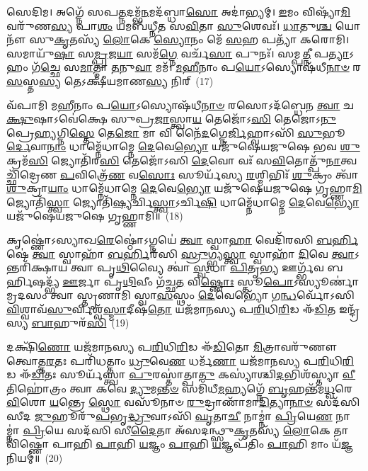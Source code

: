𑌸𑍇𑌦𑌿𑌮। 𑌅𑌗𑍍𑌨𑍇᳴ 𑌸𑌪\-\ul{𑌤𑍍𑌨}\-𑌦𑌮𑍍𑌭᳴\-\ul{𑌨}\-𑌮𑌦᳴𑌬𑍍𑌧𑌾\-\ul{𑌸𑍋} 𑌅𑌦𑌾॑𑌭𑍍𑌯𑌮𑍍। \ul{𑌇}\-𑌮𑌂 𑌵𑌿𑌷𑍍𑌯𑌾᳴\-\ul{𑌮𑌿} 𑌵𑌰𑍁᳴𑌣\-\ul{𑌸𑍍𑌯} 𑌪𑌾\-\ul{𑌶𑌂} 𑌯𑌮𑌬᳴𑌧𑍍𑌨𑍀𑌤 𑌸\-\ul{𑌵𑌿}\-𑌤𑌾 \ul{𑌸𑍁}\-𑌶𑍇𑌵𑌃᳴। \ul{𑌧𑌾}\-𑌤𑍁\-\ul{𑌶𑍍𑌚} 𑌯𑍋𑌨𑍗᳴ 𑌸𑍁\-\ul{𑌕𑍃}\-𑌤𑌸𑍍𑌯᳴ \ul{𑌲𑍋}\-𑌕𑍇 \ul{𑌸𑍍𑌯𑍋}\-𑌨𑌂 𑌮𑍇᳴ \ul{𑌸}\-𑌹 𑌪𑌤𑍍𑌯𑌾᳴ 𑌕𑌰𑍋𑌮𑌿। 𑌸𑌮𑌾𑌯𑍁᳴\-\ul{𑌷𑌾} 𑌸\-\ul{𑌮𑍍𑌪𑍍𑌰}\-𑌜\-\ul{𑌯𑌾} 𑌸𑌮᳴\-\ul{𑌗𑍍𑌨𑍇} 𑌵𑌰𑍍𑌚᳴\-\ul{𑌸𑌾} 𑌪𑍁𑌨𑌃᳴। 𑌸𑌮𑍍𑌪\-\ul{𑌤𑍍𑌨𑍀} 𑌪\-\ul{𑌤𑍍𑌯𑌾}\-\-𑌽𑌹𑌂 𑌗᳴\-\ul{𑌚𑍍𑌛𑍇} 𑌸\-\ul{𑌮𑌾}\-𑌤𑍍𑌮𑌾 \ul{𑌤}\-𑌨𑍁\-\ul{𑌵𑌾} 𑌮𑌮᳴। \ul{𑌮}\-\-\ul{𑌹𑍀}\-𑌨𑌾𑌂 𑌪\-\ul{𑌯𑍋}\-\-𑌽𑌸𑍍𑌯𑍋𑌷᳴𑌧𑍀\-\ul{𑌨𑌾}\-\-\ul{𑍞} 𑌰\-\ul{𑌸}\-𑌸𑍍𑌤\-\ul{𑌸𑍍𑌯} 𑌤𑍇\-𑌽𑌕𑍍𑌷𑍀᳴𑌯𑌮𑌾𑌣\-\ul{𑌸𑍍𑌯} 𑌨𑌿𑌰𑍍~(17)

𑌵᳴𑌪𑌾𑌮𑌿 𑌮\-\ul{𑌹𑍀}\-𑌨𑌾𑌂 𑌪\-\ul{𑌯𑍋}\-\-𑌽𑌸𑍍𑌯𑍋𑌷᳴𑌧𑍀\-\ul{𑌨𑌾}\-\-\ul{𑍞} 𑌰𑌸𑍋\-𑌽𑌦᳴𑌬𑍍𑌧𑍇𑌨 \ul{𑌤𑍍𑌵𑌾} 𑌚\-\ul{𑌕𑍍𑌷𑍁}\-𑌷𑌾\-𑌽𑌵𑍇॑𑌕𑍍𑌷𑍇 𑌸𑍁𑌪𑍍𑌰\-\ul{𑌜𑌾}\-𑌸𑍍𑌤𑍍𑌵𑌾\-\ul{𑌯} 𑌤𑍇𑌜𑍋᳴\-𑌽\-\ul{𑌸𑌿} 𑌤𑍇𑌜𑍋\-𑌽\-\ul{𑌨𑍁} 𑌪𑍍𑌰𑍇\-\ul{𑌹𑍍𑌯}\-𑌗𑍍𑌨𑌿\-\ul{𑌸𑍍𑌤𑍇} 𑌤𑍇\-\ul{𑌜𑍋} 𑌮𑌾 𑌵𑌿 𑌨𑍈᳴\-\ul{𑌦}\-𑌗𑍍𑌨𑍇\-\ul{𑌰𑍍𑌜𑌿}\-𑌹𑍍𑌵𑌾\-𑌽𑌸𑌿᳴ \ul{𑌸𑍁}\-𑌭𑍂\-\ul{𑌰𑍍𑌦𑍇}\-𑌵𑌾\-\ul{𑌨𑌾𑌂} 𑌧𑌾𑌮𑍍𑌨𑍇᳴𑌧𑌾𑌮𑍍𑌨𑍇 \ul{𑌦𑍇}\-𑌵𑍇\-\ul{𑌭𑍍𑌯𑍋} 𑌯𑌜𑍁᳴𑌷𑍇𑌯𑌜𑍁𑌷𑍇 𑌭𑌵 \ul{𑌶𑍁}\-𑌕𑍍𑌰𑌮᳴\-\ul{𑌸𑌿} 𑌜𑍍𑌯𑍋𑌤𑌿᳴𑌰\-\ul{𑌸𑌿} 𑌤𑍇𑌜𑍋᳴\-𑌽𑌸𑌿 \ul{𑌦𑍇}\-𑌵𑍋 𑌵𑌃᳴ 𑌸\-\ul{𑌵𑌿}\-𑌤𑍋𑌤𑍍𑌪𑍁᳴\-\ul{𑌨𑌾}\-𑌤𑍍𑌵𑌚𑍍𑌛𑌿᳴𑌦𑍍𑌰𑍇𑌣 \ul{𑌪}\-𑌵𑌿𑌤𑍍𑌰𑍇᳴\-\ul{𑌣} 𑌵\-\ul{𑌸𑍋𑌃} 𑌸𑍂𑌰𑍍𑌯᳴𑌸𑍍𑌯 \ul{𑌰}\-𑌶𑍍𑌮𑌿𑌭𑌿𑌃᳴ \ul{𑌶𑍁}\-𑌕𑍍𑌰𑌂 𑌤𑍍𑌵𑌾᳴ \ul{𑌶𑍁}\-𑌕𑍍𑌰𑌾\-\ul{𑌯𑌾𑌂} 𑌧𑌾𑌮𑍍𑌨𑍇᳴𑌧𑌾𑌮𑍍𑌨𑍇 \ul{𑌦𑍇}\-𑌵𑍇\-\ul{𑌭𑍍𑌯𑍋} 𑌯𑌜𑍁᳴𑌷𑍇𑌯𑌜𑍁𑌷𑍇 𑌗𑍃𑌹𑍍𑌣𑌾\-\ul{𑌮𑌿} 𑌜𑍍𑌯𑍋𑌤𑌿᳴\-\ul{𑌸𑍍𑌤𑍍𑌵𑌾} 𑌜𑍍𑌯𑍋𑌤𑌿᳴\-\ul{𑌷𑍍𑌯}\-𑌰𑍍𑌚𑌿\-\ul{𑌸𑍍𑌤𑍍𑌵𑌾}\-\-𑌽𑌰𑍍𑌚𑌿\-\ul{𑌷𑌿} 𑌧𑌾𑌮𑍍𑌨𑍇᳴𑌧𑌾𑌮𑍍𑌨𑍇 \ul{𑌦𑍇}\-𑌵𑍇\-\ul{𑌭𑍍𑌯𑍋} 𑌯𑌜𑍁᳴𑌷𑍇𑌯𑌜𑍁𑌷𑍇 𑌗𑍃𑌹𑍍𑌣𑌾𑌮𑌿॥~(18)

{\anuvakamend[{𑌉\-\ul{𑌪} 𑌨𑍀 \ul{𑌰}\-𑌶𑍍𑌮𑌿𑌭𑌿𑌃᳴ \ul{𑌶𑍁}\-𑌕𑍍𑌰𑍞 𑌷𑍋𑌡᳴𑌶 𑌚}]}

𑌕𑍃𑌷𑍍𑌣𑍋॑\-𑌽𑌸𑍍𑌯𑌾𑌖\-\ul{𑌰𑍇}\-𑌷𑍍𑌠𑍋॑\-𑌽𑌗𑍍𑌨𑌯𑍇॑ \ul{𑌤𑍍𑌵𑌾} 𑌸𑍍𑌵𑌾\-\ul{𑌹𑌾} 𑌵𑍇𑌦𑌿᳴𑌰𑌸𑌿 \ul{𑌬}\-\-\ul{𑌰𑍍}\-𑌹𑌿𑌷𑍇॑ \ul{𑌤𑍍𑌵𑌾} 𑌸𑍍𑌵𑌾𑌹𑌾᳴ \ul{𑌬}\-\-\ul{𑌰𑍍}\-𑌹𑌿𑌰᳴𑌸𑌿 \ul{𑌸𑍍𑌰𑍁}\-𑌗𑍍𑌭𑍍𑌯\-\ul{𑌸𑍍𑌤𑍍𑌵𑌾} 𑌸𑍍𑌵𑌾𑌹𑌾᳴ \ul{𑌦𑌿}\-𑌵𑍇 \ul{𑌤𑍍𑌵𑌾}\-\-𑌽𑌨𑍍𑌤𑌰𑌿᳴𑌕𑍍𑌷𑌾𑌯 𑌤𑍍𑌵𑌾 𑌪𑍃\-\ul{𑌥𑌿}\-𑌵𑍍𑌯𑍈 𑌤𑍍𑌵𑌾॑ \ul{𑌸𑍍𑌵}\-𑌧𑌾 \ul{𑌪𑌿}\-𑌤𑍃\-\ul{𑌭𑍍𑌯} 𑌊𑌰𑍍𑌗𑍍𑌭᳴𑌵 𑌬𑌰𑍍\mbox{}\-\ul{𑌹𑌿}\-𑌷𑌦𑍍𑌭𑍍𑌯᳴ \ul{𑌊}\-𑌰𑍍𑌜𑌾 𑌪𑍃᳴\-\ul{𑌥𑌿}\-𑌵𑍀𑌂 𑌗᳴𑌚𑍍𑌛\-\ul{𑌤} 𑌵𑌿\-\ul{𑌷𑍍𑌣𑍋𑌃} 𑌸𑍍𑌤𑍂\-\ul{𑌪𑍋}\-\-𑌽𑌸𑍍𑌯𑍂𑌰𑍍𑌣𑌾॑𑌮𑍍𑌰𑌦𑌸𑌂 𑌤𑍍𑌵𑌾 𑌸𑍍𑌤𑍃𑌣𑌾𑌮𑌿 𑌸𑍍𑌵𑌾\-\ul{𑌸}\-𑌸𑍍𑌥𑌂 \ul{𑌦𑍇}\-𑌵𑍇𑌭𑍍𑌯𑍋᳴ 𑌗\-\ul{𑌨𑍍𑌧}\-𑌰𑍍𑌵𑍋᳴\-𑌽𑌸𑌿 \ul{𑌵𑌿}\-𑌶𑍍𑌵𑌾𑌵᳴\-\ul{𑌸𑍁}\-𑌰𑍍𑌵𑌿𑌶𑍍𑌵᳴\-\ul{𑌸𑍍𑌮𑌾}\-𑌦𑍀𑌷᳴\-\ul{𑌤𑍋} 𑌯𑌜᳴𑌮𑌾𑌨𑌸𑍍𑌯 𑌪\-\ul{𑌰𑌿}\-𑌧𑌿\-\ul{𑌰𑌿}\-𑌡 𑌈᳴\-\ul{𑌡𑌿}\-𑌤 𑌇𑌨𑍍𑌦𑍍𑌰᳴𑌸𑍍𑌯 \ul{𑌬𑌾}\-𑌹𑍁𑌰᳴\-\ul{𑌸𑌿}\-~(19)

𑌦𑌕𑍍𑌷𑌿᳴\-\ul{𑌣𑍋} 𑌯𑌜᳴𑌮𑌾𑌨𑌸𑍍𑌯 𑌪\-\ul{𑌰𑌿}\-𑌧𑌿\-\ul{𑌰𑌿}\-𑌡 𑌈᳴\-\ul{𑌡𑌿}\-𑌤𑍋 \ul{𑌮𑌿}\-𑌤𑍍𑌰𑌾𑌵𑌰𑍁᳴𑌣𑍗 𑌤𑍍𑌵𑍋𑌤𑍍𑌤\-\ul{𑌰}\-𑌤𑌃 𑌪𑌰𑌿᳴𑌧𑌤𑍍𑌤𑌾𑌂 \ul{𑌧𑍍𑌰𑍁}\-𑌵𑍇\-\ul{𑌣} 𑌧𑌰𑍍𑌮᳴\-\ul{𑌣𑌾} 𑌯𑌜᳴𑌮𑌾𑌨𑌸𑍍𑌯 𑌪\-\ul{𑌰𑌿}\-𑌧𑌿\-\ul{𑌰𑌿}\-𑌡 𑌈᳴\-\ul{𑌡𑌿}\-𑌤𑌃 𑌸𑍂𑌰𑍍𑌯᳴𑌸𑍍𑌤𑍍𑌵𑌾 \ul{𑌪𑍁}\-𑌰𑌸𑍍𑌤𑌾॑𑌤𑍍𑌪𑌾\-\ul{𑌤𑍁} 𑌕𑌸𑍍𑌯𑌾॑𑌶𑍍𑌚𑌿\-\ul{𑌦}\-𑌭𑌿𑌶᳴𑌸𑍍𑌤𑍍𑌯𑌾 \ul{𑌵𑍀}\-𑌤𑌿𑌹𑍋॑𑌤𑍍𑌰𑌂 𑌤𑍍𑌵𑌾 𑌕𑌵𑍇 \ul{𑌦𑍍𑌯𑍁}\-𑌮\-\ul{𑌨𑍍𑌤}\-\-\ul{𑍞} 𑌸𑌮𑌿᳴𑌧𑍀\-\ul{𑌮}\-𑌹𑍍𑌯𑌗𑍍𑌨𑍇᳴ \ul{𑌬𑍃}\-𑌹𑌨𑍍𑌤᳴𑌮\-\ul{𑌧𑍍𑌵}\-𑌰𑍇 \ul{𑌵𑌿}\-𑌶𑍋 \ul{𑌯}\-𑌨𑍍𑌤𑍍𑌰𑍇 \ul{𑌸𑍍𑌥𑍋} 𑌵𑌸𑍂᳴𑌨𑌾𑍞 \ul{𑌰𑍁}\-𑌦𑍍𑌰𑌾𑌣𑌾᳴𑌮𑌾\-\ul{𑌦𑌿}\-𑌤𑍍𑌯𑌾\-\ul{𑌨𑌾}\-\-\ul{𑍞} 𑌸𑌦᳴𑌸𑌿 𑌸𑍀𑌦 \ul{𑌜𑍁}\-𑌹𑍂𑌰𑍁᳴\-\ul{𑌪}\-𑌭𑍃\-\ul{𑌦𑍍𑌧𑍍𑌰𑍁}\-𑌵𑌾\-𑌽𑌸𑌿᳴ \ul{𑌘𑍃}\-𑌤𑌾\-\ul{𑌚𑍀} 𑌨𑌾𑌮𑍍𑌨𑌾॑ \ul{𑌪𑍍𑌰𑌿}\-𑌯𑍇\-\ul{𑌣} 𑌨𑌾𑌮𑍍𑌨𑌾॑ \ul{𑌪𑍍𑌰𑌿}\-𑌯𑍇 𑌸𑌦᳴𑌸𑌿 𑌸𑍀\-\ul{𑌦𑍈}\-𑌤𑌾 𑌅᳴𑌸𑌦𑌨𑍍𑌥𑍍𑌸𑍁\-\ul{𑌕𑍃}\-𑌤𑌸𑍍𑌯᳴ \ul{𑌲𑍋}\-𑌕𑍇 𑌤𑌾 𑌵𑌿᳴𑌷𑍍𑌣𑍋 𑌪𑌾𑌹𑌿 \ul{𑌪𑌾}\-𑌹𑌿 \ul{𑌯}\-𑌜𑍍𑌞𑌂 \ul{𑌪𑌾}\-𑌹𑌿 \ul{𑌯}\-𑌜𑍍𑌞𑌪᳴𑌤𑌿𑌂 \ul{𑌪𑌾}\-𑌹𑌿 𑌮𑌾𑌂 𑌯᳴\-\ul{𑌜𑍍𑌞}\-𑌨𑌿𑌯𑌮𑍍॑॥~(20)


